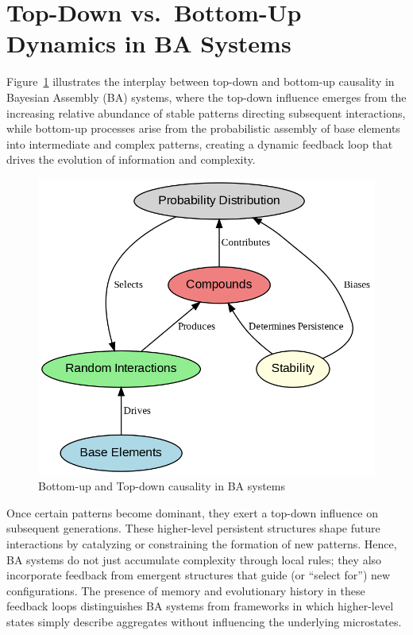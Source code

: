 \documentclass[entropy,article,submit,pdftex,moreauthors]{Definitions/mdpi}
\begin{document}
\section{Top-Down vs.\ Bottom-Up Dynamics in BA Systems}
\label{sec:topdown-bottomup}

Figure~\ref{fig:ba_topdown} illustrates the interplay between top-down and bottom-up causality in Bayesian Assembly (BA) systems, where the top-down influence emerges from the increasing relative abundance of stable patterns directing subsequent interactions, while bottom-up processes arise from the probabilistic assembly of base elements into intermediate and complex patterns, creating a dynamic feedback loop that drives the evolution of information and complexity.

\begin{figure}[h]
    \centering
    \includegraphics[width=0.7\linewidth,height=0.7\linewidth]{images/ba_topdown.png}
    \caption{Bottom-up and Top-down causality in BA systems}
    \label{fig:ba_topdown}
\end{figure}

Once certain patterns become dominant, they exert a top-down influence on subsequent generations. These higher-level persistent structures shape future interactions by catalyzing or constraining the formation of new patterns. Hence, BA systems do not just accumulate complexity through local rules; they also incorporate feedback from emergent structures that guide (or ``select for'') new configurations. The presence of memory and evolutionary history in these feedback loops distinguishes BA systems from frameworks in which higher-level states simply describe aggregates without influencing the underlying microstates.
\end{document}
